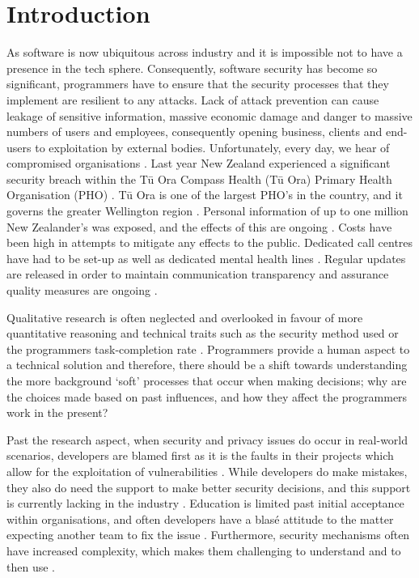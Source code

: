 \chapter{Introduction}\label{C:intro}

\par As software is now ubiquitous across industry and it is impossible not to have a presence in the tech sphere. Consequently, software security has become so significant, programmers have to ensure that the security processes that they implement are resilient to any attacks. Lack of attack prevention can cause leakage of sensitive information, massive economic damage and danger to massive numbers of users and employees, consequently opening business, clients and end-users to exploitation by external bodies. Unfortunately, every day, we hear of compromised organisations \cite{1}. Last year New Zealand experienced a significant security breach within the Tū Ora Compass Health (Tū Ora) Primary Health Organisation (PHO) \cite{incident}. Tū Ora is one of the largest PHO's in the country, and it governs the greater Wellington region \cite{incident}. Personal information of up to one million New Zealander's was exposed, and the effects of this are ongoing \cite{incident}. Costs have been high in attempts to mitigate any effects to the public. Dedicated call centres have had to be set-up as well as dedicated mental health lines \cite{healthpol, incident}. Regular updates are released in order to maintain communication transparency and assurance quality measures are ongoing \cite{healthpol, incident}.  
\newline
\par Qualitative research is often neglected and overlooked in favour of more quantitative reasoning and technical traits such as the security method used or the programmers task-completion rate \cite{3}. Programmers provide a human aspect to a technical solution and therefore, there should be a shift towards understanding the more background ‘soft’ processes that occur when making decisions; why are the choices made based on past influences, and how they affect the programmers work in the present? 
\newline
\par Past the research aspect, when security and privacy issues do occur in real-world scenarios, developers are blamed first as it is the faults in their projects which allow for the exploitation of vulnerabilities \cite{4}. While developers do make mistakes, they also do need the support to make better security decisions, and this support is currently lacking in the industry \cite{4}. Education is limited past initial acceptance within organisations, and often developers have a blasé attitude to the matter expecting another team to fix the issue \cite{5}. Furthermore, security mechanisms often have increased complexity, which makes them challenging to understand and to then use \cite{6}.
